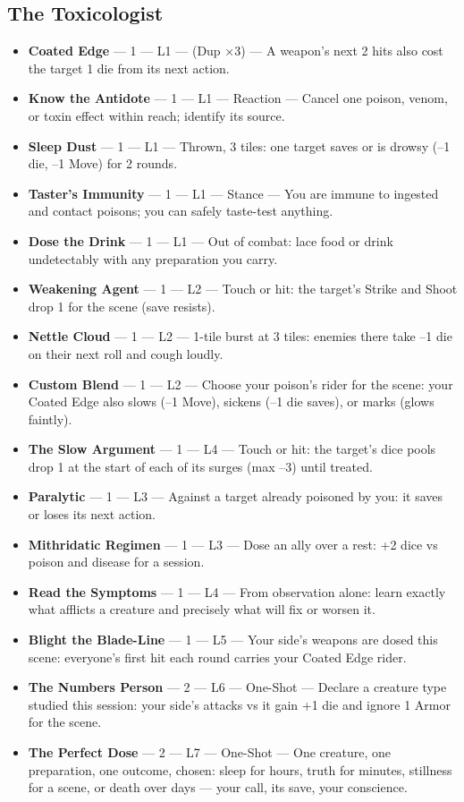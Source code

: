 \subsection{The Toxicologist}
\begin{itemize}
    \item \textbf{Coated Edge} --- 1 --- L1 --- (Dup ×3) --- A weapon's next 2 hits also cost the target 1 die from its next action.
    \item \textbf{Know the Antidote} --- 1 --- L1 --- Reaction --- Cancel one poison, venom, or toxin effect within reach; identify its source.
    \item \textbf{Sleep Dust} --- 1 --- L1 --- Thrown, 3 tiles: one target saves or is drowsy (--1 die, --1 Move) for 2 rounds.
    \item \textbf{Taster's Immunity} --- 1 --- L1 --- Stance --- You are immune to ingested and contact poisons; you can safely taste-test anything.
    \item \textbf{Dose the Drink} --- 1 --- L1 --- Out of combat: lace food or drink undetectably with any preparation you carry.
    \item \textbf{Weakening Agent} --- 1 --- L2 --- Touch or hit: the target's Strike and Shoot drop 1 for the scene (save resists).
    \item \textbf{Nettle Cloud} --- 1 --- L2 --- 1-tile burst at 3 tiles: enemies there take --1 die on their next roll and cough loudly.
    \item \textbf{Custom Blend} --- 1 --- L2 --- Choose your poison's rider for the scene: your Coated Edge also slows (--1 Move), sickens (--1 die saves), or marks (glows faintly).
    \item \textbf{The Slow Argument} --- 1 --- L4 --- Touch or hit: the target's dice pools drop 1 at the start of each of its surges (max --3) until treated.
    \item \textbf{Paralytic} --- 1 --- L3 --- Against a target already poisoned by you: it saves or loses its next action.
    \item \textbf{Mithridatic Regimen} --- 1 --- L3 --- Dose an ally over a rest: +2 dice vs poison and disease for a session.
    \item \textbf{Read the Symptoms} --- 1 --- L4 --- From observation alone: learn exactly what afflicts a creature and precisely what will fix or worsen it.
    \item \textbf{Blight the Blade-Line} --- 1 --- L5 --- Your side's weapons are dosed this scene: everyone's first hit each round carries your Coated Edge rider.
    \item \textbf{The Numbers Person} --- 2 --- L6 --- One-Shot --- Declare a creature type studied this session: your side's attacks vs it gain +1 die and ignore 1 Armor for the scene.
    \item \textbf{The Perfect Dose} --- 2 --- L7 --- One-Shot --- One creature, one preparation, one outcome, chosen: sleep for hours, truth for minutes, stillness for a scene, or death over days --- your call, its save, your conscience.
\end{itemize}
